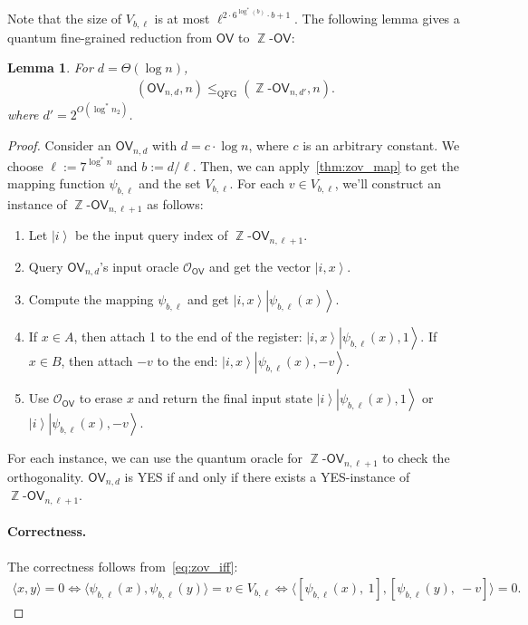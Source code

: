 \documentclass[10pt,a4paper]{article}
\newtheorem{lemma}[theorem]{Lemma}
\newcommand{\ip}[2]{\langle {#1} , {#2} \rangle}
\DeclareMathOperator*{\Z}{\mathbb{Z}}
\newcommand{\ket}[1]{\left| #1 \right\rangle}
\newcommand{\ora}{\mathcal{O}}
\newcommand{\QFG}{\mathrm{QFG}}
\newcommand{\OV}{\ensuremath{\mathsf{OV}}}
\newcommand{\ZOV}{\ensuremath{\Z\text{-}\mathsf{OV}}}
\begin{document}
Note that the size of $V_{b,\ell}$ is at most $\ell^{2\cdot 6^{\log^* (b)}\cdot b+1}$. 
The following lemma gives a quantum fine-grained reduction from $\OV$ to $\ZOV$:
\begin{lemma}\label{lem:ov_2_zov}
For $d=\Theta(\log n)$,
\begin{align}
    (\OV_{n,d}, n)\leq_{\QFG} (\ZOV_{n,d'}, n).
\end{align}
where $d'=2^{O(\log^* n_2)}$.
\end{lemma}
\begin{proof}
Consider an $\OV_{n,d}$ with $d=c\cdot \log n$, where $c$ is an arbitrary constant. We choose $\ell:=7^{\log^* n}$ and $b:=d/\ell$. Then, we can apply~\cref{thm:zov_map} to get the mapping function $\psi_{b,\ell}$ and the set $V_{b,\ell}$. For each $v\in V_{b,\ell}$, we'll construct an instance of $\ZOV_{n,\ell+1}$ as follows:
\begin{enumerate}
    \item Let $\ket{i}$ be the input query index of $\ZOV_{n,\ell+1}$.  
    \item Query $\OV_{n,d}$'s input oracle $\ora_{\OV}$ and get the vector $\ket{i,x}$.
    \item Compute the mapping $\psi_{b,\ell}$ and get $\ket{i,x}\ket{\psi_{b,\ell}(x)}$.
    \item If $x\in A$, then attach 1 to the end of the register: $\ket{i,x}\ket{\psi_{b,\ell}(x),1}$. If $x\in B$, then attach $-v$ to the end: $\ket{i,x}\ket{\psi_{b,\ell}(x),-v}$.
    \item Use $\ora_{\OV}$ to erase $x$ and return the final input state $\ket{i}\ket{\psi_{b,\ell}(x),1}$ or $\ket{i}\ket{\psi_{b,\ell}(x),-v}$.
\end{enumerate}
For each instance, we can use the quantum oracle for $\ZOV_{n,\ell+1}$ to check the orthogonality. $\OV_{n,d}$ is YES if and only if there exists a YES-instance of $\ZOV_{n,\ell+1}$.

\paragraph*{Correctness.} The correctness follows from~\cref{eq:zov_iff}: 
\begin{align}
\ip{x}{y}=0 \Leftrightarrow \ip{\psi_{b,\ell}(x)}{\psi_{b,\ell}(y)}=v\in V_{b,\ell} \Leftrightarrow \ip{[\psi_{b , \ell}(x), ~ 1]}{[\psi_{b,\ell}(y), ~ -v]}=0. 
\end{align}


\end{proof}
\end{document}
